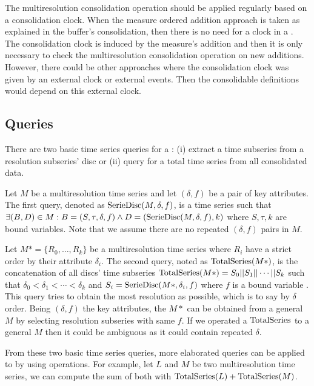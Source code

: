 The multiresolution consolidation operation should be applied
regularly based on a consolidation clock. When the measure ordered
addition approach is taken as explained in the buffer's consolidation,
then there is no need for a clock in a . The consolidation clock
is induced by the measure's addition and then it is only necessary to
check the multiresolution consolidation operation on new
additions. However, there could be other approaches where the
consolidation clock was given by an external clock or external
events. Then the consolidable definitions would depend on this
external clock.





\subsection{Queries}

There are two basic time series queries for a : (i)
extract a time subseries from a resolution subseries' disc or (ii)
query for a total time series from all consolidated data.

Let $M$ be a multiresolution time series and let $(\delta,f)$ be a
pair of key attributes.  The first query, denoted as
$\operatorname{SerieDisc}(M,\delta,f)$, is a time series such that $\exists (B,D)
\in M: B=(S,\tau,\delta,f) \wedge D=(\operatorname{SerieDisc}(M,\delta,f), k) $
where $S,\tau,k$ are bound variables.  Note that we
assume there are no repeated $(\delta,f)$ pairs in $M$.

Let $M*=\{R_0, \dots, R_k\}$ be a multiresolution time series where
$R_i$ have a strict order by their attribute $\delta_i$.  The second
query, noted as $\operatorname{TotalSeries}(M*)$, is the concatenation of all discs'
time subseries $\operatorname{TotalSeries}(M*) = S_{0} || S_{1} || \cdots || S_{k}$
such that $\delta_0 < \delta_1 < \cdots < \delta_k$ and
$S_i=\operatorname{SerieDisc}(M*,\delta_i,f)$ where $f$ is a bound variable . This
query tries to obtain the most resolution as possible, which is to say
by $\delta$ order.  Being $(\delta,f)$ the key attributes, the $M*$
can be obtained from a general $M$ by selecting resolution subseries
with same $f$. If we operated a $\operatorname{TotalSeries}$ to a general $M$ then
it could be ambiguous as it could contain repeated $\delta$.

From these two basic time series queries, more elaborated queries can
be applied to  by using  operations. For
example, let $L$ and $M$ be two multiresolution time series, we
can compute the sum of both with $\operatorname{TotalSeries}(L) +
\operatorname{TotalSeries}(M)$.





